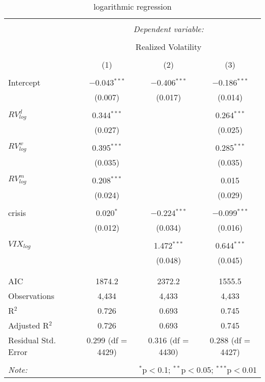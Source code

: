 
\begin{table}[!htbp] \centering 
  \caption{logarithmic regression} 
  \label{} 
\begin{tabular}{@{\extracolsep{5pt}}lccc} 
\\[-1.8ex]\hline 
\hline \\[-1.8ex] 
 & \multicolumn{3}{c}{\textit{Dependent variable:}} \\ 
\cline{2-4} 
\\[-1.8ex] & \multicolumn{3}{c}{Realized Volatility} \\ 
\\[-1.8ex] & (1) & (2) & (3)\\ 
\hline \\[-1.8ex] 
 Intercept & $-$0.043$^{***}$ & $-$0.406$^{***}$ & $-$0.186$^{***}$ \\ 
  & (0.007) & (0.017) & (0.014) \\ 
  & & & \\ 
 $RV^{d}_{log}$ & 0.344$^{***}$ &  & 0.264$^{***}$ \\ 
  & (0.027) &  & (0.025) \\ 
  & & & \\ 
 $RV^{w}_{log}$ & 0.395$^{***}$ &  & 0.285$^{***}$ \\ 
  & (0.035) &  & (0.035) \\ 
  & & & \\ 
 $RV^{m}_{log}$ & 0.208$^{***}$ &  & 0.015 \\ 
  & (0.024) &  & (0.029) \\ 
  & & & \\ 
 crisis & 0.020$^{*}$ & $-$0.224$^{***}$ & $-$0.099$^{***}$ \\ 
  & (0.012) & (0.034) & (0.016) \\ 
  & & & \\ 
 $VIX_{log}$ &  & 1.472$^{***}$ & 0.644$^{***}$ \\ 
  &  & (0.048) & (0.045) \\ 
  & & & \\ 
\hline \\[-1.8ex] 
AIC & 1874.2 & 2372.2 & 1555.5 \\ 
Observations & 4,434 & 4,433 & 4,433 \\ 
R$^{2}$ & 0.726 & 0.693 & 0.745 \\ 
Adjusted R$^{2}$ & 0.726 & 0.693 & 0.745 \\ 
Residual Std. Error & 0.299 (df = 4429) & 0.316 (df = 4430) & 0.288 (df = 4427) \\ 
\hline 
\hline \\[-1.8ex] 
\textit{Note:}  & \multicolumn{3}{r}{$^{*}$p$<$0.1; $^{**}$p$<$0.05; $^{***}$p$<$0.01} \\ 
\end{tabular} 
\end{table} 
